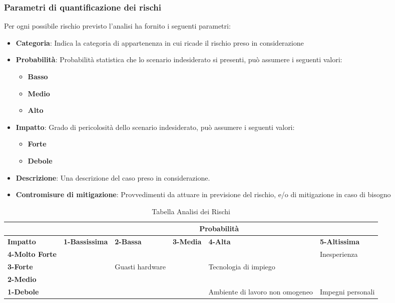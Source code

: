 \documentclass{scalatekids-article}
\begin{document}
\subsubsection{Parametri di quantificazione dei rischi}
Per ogni possibile rischio previsto l'analisi ha fornito i seguenti parametri:
\begin{itemize}
\item\textbf{Categoria}: Indica la categoria di appartenenza in cui ricade il
  rischio preso in considerazione
\item\textbf{Probabilità}: Probabilità statistica che lo scenario indesiderato
  si presenti, può assumere i seguenti valori:
  \begin{itemize}
  \item\textbf{Basso}
  \item\textbf{Medio}
  \item\textbf{Alto}
  \end{itemize}
\item\textbf{Impatto}: Grado di pericolosità dello scenario indesiderato, può
  assumere i seguenti valori:
  \begin{itemize}
  \item\textbf{Forte}
  \item\textbf{Debole}
  \end{itemize}
\item\textbf{Descrizione}: Una descrizione del caso preso in considerazione.
\item\textbf{Contromisure di mitigazione}: Provvedimenti da attuare in
  previsione del rischio, e/o di mitigazione in caso di bisogno
\end{itemize}
\begin{table}[H]
  \centering
  \scriptsize
  \caption{Tabella Analisi dei Rischi}
  \begin{tabular}{|m{2cm}|m{2cm}|m{2cm}|m{2cm}|m{2cm}|m{2cm}|}
    \hline
    & \multicolumn{5}{|c|}{\textbf{Probabilità}}\\
    \hline \bf Impatto & \bf 1-Bassissima & \bf 2-Bassa & \bf 3-Media & \bf 4-Alta & \textbf{5-Altissima}\\[10pt]

    \hline \bf 4-Molto Forte & \cellcolor{yellow!50} & \cellcolor{red!50} & \cellcolor{red!50} & \cellcolor{red!50} &\cellcolor{red!50} Inesperienza\\ [10pt]

    \hline \bf 3-Forte &\cellcolor{green!50} & \cellcolor{yellow!50}Guasti hardware & \cellcolor{yellow!50} & \cellcolor{red!50}Tecnologia di impiego &\cellcolor{red!50} \\ [10pt]

    \hline \bf 2-Medio & \cellcolor{green!50} & \cellcolor{green!50} & \cellcolor{yellow!50} &\cellcolor{yellow!50} &\cellcolor{red!50} \\ [10pt]

    \hline \bf 1-Debole & \cellcolor{green!50} & \cellcolor{green!50} & \cellcolor{green!50} &\cellcolor{yellow!50}Ambiente di lavoro non omogeneo &\cellcolor{yellow!50}Impegni personali \\ [10pt]
    \hline
  \end{tabular} \\
\end{table}
\end{document}
